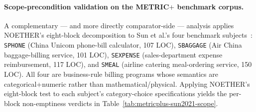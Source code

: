\documentclass[acmsmall, screen]{acmart}
\begin{document}
\paragraph{Scope-precondition validation on the METRIC$+$ benchmark corpus.}
\label{para:metricplus-sun2021-scope}
A complementary --- and more directly comparator-side --- analysis applies
NOETHER's eight-block decomposition to Sun et al.'s four
benchmark subjects~\cite{SunMETRICplus2021}: \texttt{SPHONE} (China
Unicom phone-bill calculator, 107 LOC), \texttt{SBAGGAGE} (Air China
baggage-billing service, 101 LOC), \texttt{SEXPENSE} (sales-department
expense reimbursement, 117 LOC), and \texttt{SMEAL} (airline catering
meal-ordering service, 150 LOC). All four are business-rule billing
programs whose semantics are categorical+numeric rather than
mathematical/physical. Applying NOETHER's eight-block test to each
subject's category-choice specifications yields the per-block
non-emptiness verdicts in Table~\ref{tab:metricplus-sun2021-scope}.
\end{document}
